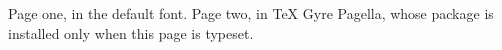 \documentclass{article}
\begin{document}
Page one, in the default font.
\newpage
{\selectfont Page two, in TeX Gyre Pagella, whose package is
installed only when this page is typeset.}
\end{document}
